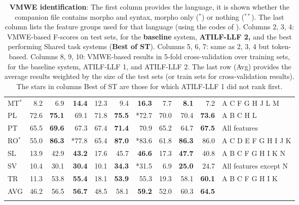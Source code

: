 \documentclass[output=paper,modfonts]{langscibook}
\begin{document}
\begin{table}
\begin{tabular}{lrrrrrrrrrl}
MT$^{*}$ 	& 8.2 			& 6.9 			& \textbf{14.4} & 12.3 & 9.4 & \textbf{16.3} & 7.7 & \textbf{8.1} & 7.2 & \scriptsize{A C F G H J L M} \\
PL 	& 72.6 			& \textbf{75.1} & 69.1 & 71.8 & \textbf{75.5} & *72.7 & 70.0 & 70.4 & \textbf{73.6} & \scriptsize{A B C H L} \\ 
PT 	& 65.5 			& \textbf{69.6} & 67.3 & 67.4 & \textbf{71.4} & 70.9 & 65.2 & 64.7 & \textbf{67.5} & \scriptsize{All features} \\
RO$^{*}$ 	& 55.0 			& \textbf{86.3} & *77.8 & 65.4 & \textbf{ 87.0} & *83.6 & 61.8 & \textbf{86.3} & 86.0 & \scriptsize{A C D E F G H I J K} \\
SL 	& 13.9 			& 42.9 			& \textbf{ 43.2} & 17.6 & 45.7 & \textbf{46.6} & 17.3 & \textbf{47.7} & 40.8 & \scriptsize{A B C F G H I K N} \\
SV 	& 10.4 			& 30.1 			& \textbf{30.4} & 10.1 & \textbf{34.3} & *31.5 & 6.9 & \textbf{25.0} & 24.7 & \scriptsize{All features except N} \\
TR 	& 11.3 			& 53.8 			& \textbf{55.4} & 18.1 & \textbf{53.9} & 55.3 & 19.3 & 58.1 & \textbf{60.1} & \scriptsize{A B C F G H I K} \\ \hline
AVG & 46.2 & 56.5 & \textbf{56.7} & 48.5 & 58.1 & \textbf{59.2} & 52.0 & 60.3 & \textbf{64.5} &  \\
\lspbottomrule
\end{tabular}
\caption{\textbf{VMWE identification}: The first column provides the language, it is shown whether the companion file contains morpho and syntax, morpho only ($^{*}$) or nothing ($^{**}$). The last column lists the feature groups used for that language (using the codes of ). Columns  2, 3, 4: VMWE-based F-scores on test sets, for the \textbf{baseline} system, \textbf{ATILF-LLF 2, }and the best performing Shared task systems (\textbf{Best of ST}). Columns 5, 6, 7: same as 2, 3, 4 but token-based. Columns 8, 9, 10: VMWE-based results in 5-fold cross-validation over training sets, for the baseline system, ATILF-LLF 1, and ATILF-LLF 2.  The last row (Avg) provides the average results weighted by the size of the test sets (or train sets for cross-validation results). The stars in columns Best of ST are those for which ATILF-LLF 1 did not rank first.}
\label{tab:iden}
\end{table}
\end{document}
